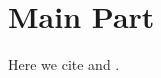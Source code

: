 \documentclass[./main]{subfiles}
\begin{document}
\section{Main Part}
Here we cite \citet{Mitchell1191} and \citet{Haxby2425}.

\end{document}
